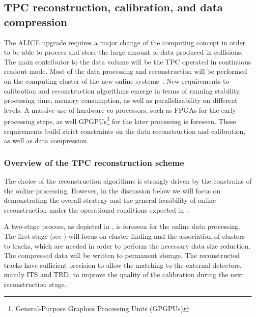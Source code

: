 \subsection{TPC reconstruction, calibration, and data compression}
\label{sec:calibreco:reco:overview}

The ALICE upgrade requires a major change of the computing concept in
order to be able to process and store the large amount of data
produced in \pbpb collisions. The main contributor to the data volume
will be the TPC operated in continuous readout mode.
Most of the data processing and reconstruction will be performed on the
computing cluster of the new online systems~\cite{ALICELOI}.
New requirements to calibration and reconstruction algorithms emerge in
terms of running stability, processing time, memory consumption, as well
as parallelizability on different levels.
A massive use of hardware co-processors, such as FPGAs for the early
processing steps, as well GPGPUs\footnote{General-Purpose Graphics
Processing Units (GPGPUs)} for the later processing is foreseen.
These requirements build strict constraints on the data reconstruction
and calibration, as well as data compression.


\subsubsection{Overview of the TPC reconstruction scheme}
\label{sec:calibreco:intro:reco}


The choice of the reconstruction algorithms is strongly driven
by the constrains of the online processing.
However, in the discussion below we will focus on demonstrating the
overall strategy and the general feasibility of online reconstruction
under the operational conditions expected in .

A two-stage process, as depicted in
, is foreseen for the online data
processing.
The first stage (see \cite{TPCTDR}) will focus on
cluster finding and the association of clusters to tracks, which are
needed in order to perform the necessary data size reduction.
The compressed data will be written to permanent storage.
The reconstructed tracks have sufficient precision to allow the matching
to the external detectors, mainly ITS and TRD, to improve the quality of
the calibration during the next reconstruction stage.

